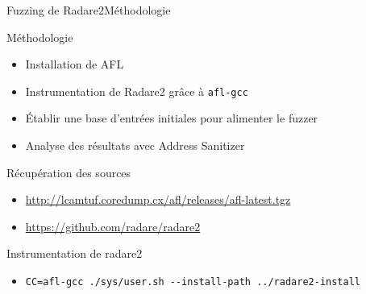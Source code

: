 \begin{frame}[fragile]{Fuzzing de Radare2}{Méthodologie}
  \begin{block}{Méthodologie}
    \begin{itemize}
    \item{Installation de AFL}
    \item{Instrumentation de Radare2 grâce à \lstinline{afl-gcc}}
    \item{Établir une base d'entrées initiales pour alimenter le fuzzer}
    \item{Analyse des résultats avec Address Sanitizer}
    \end{itemize}
  \end{block}

  \begin{exampleblock}{Récupération des sources}
    \begin{itemize}
    \item{\url{http://lcamtuf.coredump.cx/afl/releases/afl-latest.tgz}}
    \item{\url{https://github.com/radare/radare2}}
    \end{itemize}
  \end{exampleblock}

  \vfill

  \begin{exampleblock}{Instrumentation de radare2}
    \begin{itemize}
    \item \lstinline{CC=afl-gcc ./sys/user.sh --install-path ../radare2-install}
    \end{itemize}
  \end{exampleblock}

\end{frame}


